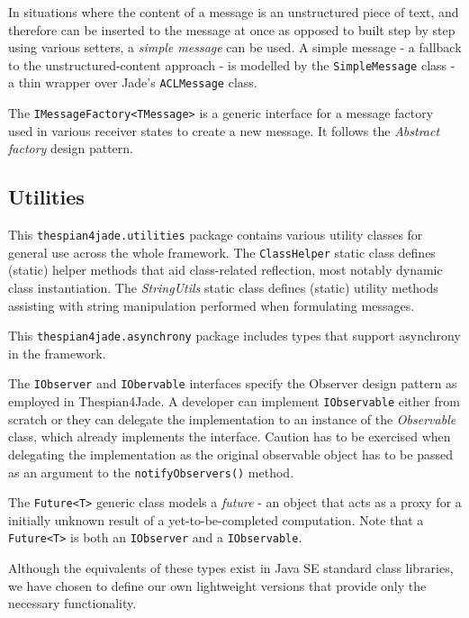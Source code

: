 In situations where the content of a message is an unstructured piece of text, and therefore can be inserted to the message at once as opposed to built step by step using various setters, a \textit{simple message} can be used.
A simple message - a fallback to the unstructured-content approach - is modelled by the \texttt{SimpleMessage} class - a thin wrapper over Jade's \texttt{ACLMessage} class.

The \texttt{IMessageFactory<TMessage>} is a generic interface for a message factory used in various receiver states to create a new message.
It follows the \textit{Abstract factory} design pattern.

\subsection{Utilities}

This \texttt{thespian4jade.utilities} package contains various utility classes for general use across the whole framework.
The \texttt{ClassHelper} static class defines (static) helper methods that aid class-related reflection, most notably dynamic class instantiation.
The \textit{StringUtils} static class defines (static) utility methods assisting with string manipulation performed when formulating messages.

This \texttt{thespian4jade.asynchrony} package includes types that support asynchrony in the framework.

The \texttt{IObserver} and \texttt{IObervable} interfaces specify the Observer design pattern as employed in Thespian4Jade.
A developer can implement \texttt{IObservable} either from scratch or they can delegate the implementation to an instance of the \textit{Observable} class, which already implements the interface.
Caution has to be exercised when delegating the implementation as the original observable object has to be passed as an argument to the \texttt{notifyObservers()} method.

The \texttt{Future<T>} generic class models a \textit{future} - an object that acts as a proxy for a initially unknown result of a yet-to-be-completed computation.
Note that a \texttt{Future<T>} is both an \texttt{IObserver} and a \texttt{IObservable}.

Although the equivalents of these types exist in Java SE standard class libraries, we have chosen to define our own lightweight versions that provide only the necessary functionality. 

